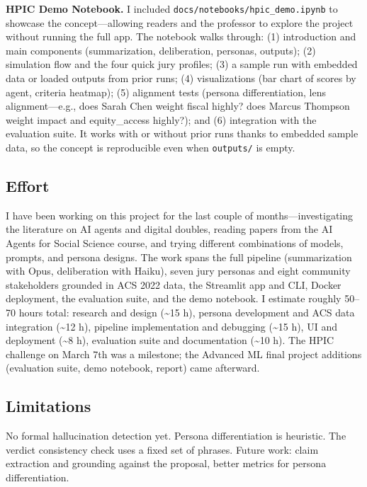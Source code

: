 \documentclass[
  11pt,
]{article}
\begin{document}
\textbf{HPIC Demo Notebook.} I included
\texttt{docs/notebooks/hpic\_demo.ipynb} to showcase the
concept---allowing readers and the professor to explore the project
without running the full app. The notebook walks through: (1)
introduction and main components (summarization, deliberation, personas,
outputs); (2) simulation flow and the four quick jury profiles; (3) a
sample run with embedded data or loaded outputs from prior runs; (4)
visualizations (bar chart of scores by agent, criteria heatmap); (5)
alignment tests (persona differentiation, lens alignment---e.g., does
Sarah Chen weight fiscal highly? does Marcus Thompson weight impact and
equity\_access highly?); and (6) integration with the evaluation suite.
It works with or without prior runs thanks to embedded sample data, so
the concept is reproducible even when \texttt{outputs/} is empty.

\subsection{Effort}\label{effort}

I have been working on this project for the last couple of
months---investigating the literature on AI agents and digital doubles,
reading papers from the AI Agents for Social Science course, and trying
different combinations of models, prompts, and persona designs. The work
spans the full pipeline (summarization with Opus, deliberation with
Haiku), seven jury personas and eight community stakeholders grounded in
ACS 2022 data, the Streamlit app and CLI, Docker deployment, the
evaluation suite, and the demo notebook. I estimate roughly 50--70 hours
total: research and design (\textasciitilde15 h), persona development
and ACS data integration (\textasciitilde12 h), pipeline implementation
and debugging (\textasciitilde15 h), UI and deployment (\textasciitilde8
h), evaluation suite and documentation (\textasciitilde10 h). The HPIC
challenge on March 7th was a milestone; the Advanced ML final project
additions (evaluation suite, demo notebook, report) came afterward.

\subsection{Limitations}\label{limitations}

No formal hallucination detection yet. Persona differentiation is
heuristic. The verdict consistency check uses a fixed set of phrases.
Future work: claim extraction and grounding against the proposal, better
metrics for persona differentiation.
\end{document}
